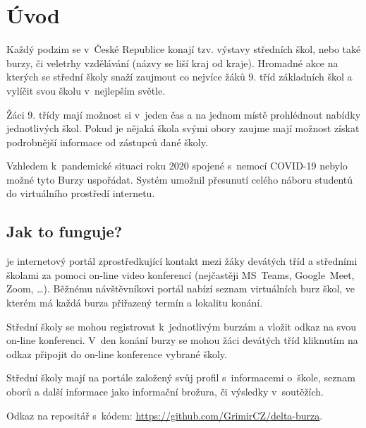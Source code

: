 \chapter*{Úvod}

Každý podzim se v~České Republice konají tzv. výstavy středních škol, nebo také burzy, či veletrhy vzdělávání (názvy se liší kraj od kraje).
Hromadné akce na kterých se střední školy snaží zaujmout co nejvíce žáků 9. tříd základních škol a vylíčit svou školu v~nejlepším světle.

Žáci 9. třídy mají možnost si v~jeden čas a na jednom místě prohlédnout nabídky jednotlivých škol.
Pokud je nějaká škola svými obory zaujme mají možnost získat podrobnější informace od zástupců dané školy. 

Vzhledem k~pandemické situaci roku 2020 spojené s~nemocí COVID-19 nebylo možné tyto Burzy uspořádat. Systém \bso{} umožnil přesunutí celého náboru studentů do virtuálního prostředí internetu.

\section*{Jak to funguje?}
\bso{} je internetový portál zprostředkující kontakt mezi žáky devátých tříd a středními školami za pomoci on-line video konferencí (nejčastěji MS~Teams\cite{ms-teams}, Google~Meet\cite{google-meet}, Zoom\cite{zoom}, \ldots). 
Běžnému návštěvníkovi portál nabízí seznam virtuálních burz škol, ve kterém má každá burza přiřazený termín a lokalitu konání.

Střední školy se mohou registrovat k~jednotlivým burzám a vložit odkaz na svou on-line konferenci. V~den konání burzy se mohou žáci devátých tříd kliknutím na odkaz připojit do on-line konference vybrané školy.

Střední školy mají na portále založený svůj profil s~informacemi o~škole, seznam oborů a další informace jako informační brožura, či výsledky v~soutěžích.

Odkaz na repositář s~kódem: \href{https://github.com/GrimirCZ/delta-burza}{https://github.com/GrimirCZ/delta-burza}.

\pagebreak

